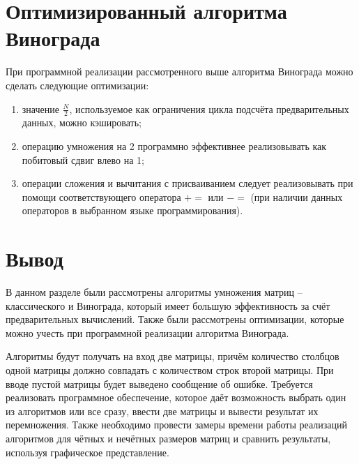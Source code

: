\section{Оптимизированный алгоритма Винограда}

При программной реализации рассмотренного выше алгоритма Винограда можно сделать следующие оптимизации:
\begin{enumerate}
	\item значение $\frac{N}{2}$, используемое как ограничения цикла подсчёта предварительных данных, можно кэшировать;
	\item операцию умножения на 2 программно эффективнее реализовывать как побитовый сдвиг влево на 1;
	\item операции сложения и вычитания с присваиванием следует реализовывать при помощи соответствующего оператора $+=$ или $-=$ (при наличии данных операторов в выбранном языке программирования).
\end{enumerate}

\section{Вывод}
В данном разделе были рассмотрены алгоритмы умножения матриц – классического и Винограда, который имеет большую эффективность за счёт предварительных вычислений. Также были рассмотрены оптимизации, которые можно учесть при программной реализации алгоритма Винограда.

Алгоритмы будут получать на вход две матрицы, причём количество столбцов одной матрицы должно совпадать с количеством строк второй матрицы. При вводе пустой матрицы будет выведено сообщение об ошибке. Требуется реализовать программное обеспечение, которое даёт возможность выбрать один из алгоритмов или все сразу, ввести две матрицы и вывести результат их перемножения. Также необходимо провести замеры времени работы реализаций алгоритмов для чётных и нечётных размеров матриц и сравнить результаты, используя графическое представление.
